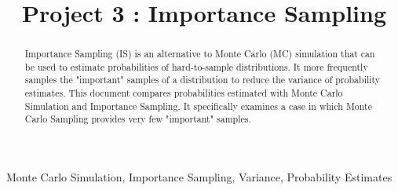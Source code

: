 \documentclass[conference]{IEEEtran}
\begin{document}
\title{Project 3 : Importance Sampling}

\author{
}
\maketitle

\begin{abstract}
Importance Sampling (IS) is an alternative to Monte Carlo (MC) simulation that can be used to estimate probabilities of hard-to-sample distributions. It more frequently samples the "important" samples of a distribution to reduce the variance of probability estimates. This document compares probabilities estimated with Monte Carlo Simulation and Importance Sampling. It specifically examines a case in which Monte Carlo Sampling provides very few "important" samples.
\end{abstract}

\begin{IEEEkeywords}
Monte Carlo Simulation, Importance Sampling,  Variance, Probability Estimates
\end{IEEEkeywords}
\end{document}
